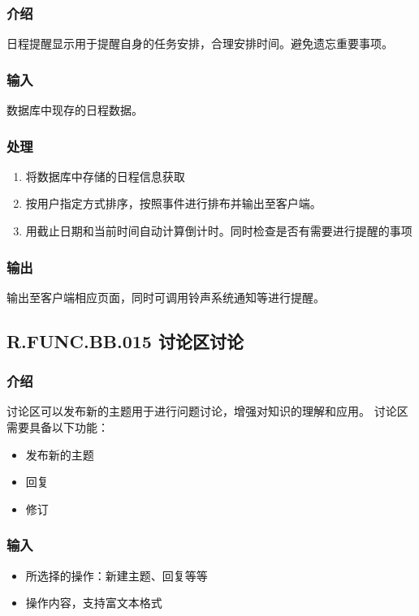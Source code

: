 \begin{enumerate}
    \subsubsection{介绍}
    日程提醒显示用于提醒自身的任务安排，合理安排时间。避免遗忘重要事项。
    \subsubsection{输入}
    数据库中现存的日程数据。
    \subsubsection{处理}
    \begin{enumerate}
      \item 将数据库中存储的日程信息获取
      \item 按用户指定方式排序，按照事件进行排布并输出至客户端。
      \item 用截止日期和当前时间自动计算倒计时。同时检查是否有需要进行提醒的事项
    \end{enumerate}
    \subsubsection{输出}
    输出至客户端相应页面，同时可调用铃声系统通知等进行提醒。

  \subsection{R.FUNC.BB.015 讨论区讨论}
    \subsubsection{介绍}
    讨论区可以发布新的主题用于进行问题讨论，增强对知识的理解和应用。
    讨论区需要具备以下功能：
    \begin{itemize}
      \item 发布新的主题
      \item 回复
      \item 修订
    \end{itemize}
    \subsubsection{输入}
    \begin{itemize}
      \item 所选择的操作：新建主题、回复等等
      \item 操作内容，支持富文本格式
    \end{itemize}

\end{enumerate}
